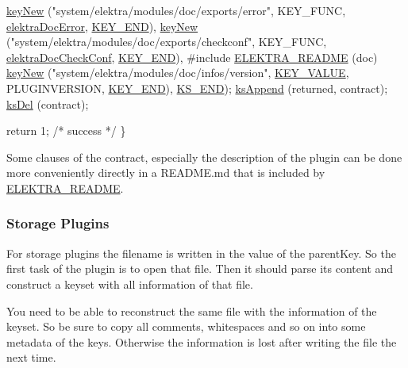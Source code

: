 \begin{DoxyCodeInclude}
                               \hyperlink{group__key_gad23c65b44bf48d773759e1f9a4d43b89}{keyNew} (\textcolor{stringliteral}{"system/elektra/modules/doc/exports/error"}, KEY\_FUNC, 
      \hyperlink{group__plugin_gad74b35f558ac7c3262f6069c5c47dc79}{elektraDocError}, \hyperlink{group__key_gga91fb3178848bd682000958089abbaf40aa8adb6fcb92dec58fb19410eacfdd403}{KEY\_END}),
                               \hyperlink{group__key_gad23c65b44bf48d773759e1f9a4d43b89}{keyNew} (\textcolor{stringliteral}{"system/elektra/modules/doc/exports/checkconf"}, KEY\_FUNC, 
      \hyperlink{group__plugin_ga1c8702efe0f3853c2d7ecca0889f78e8}{elektraDocCheckConf}, \hyperlink{group__key_gga91fb3178848bd682000958089abbaf40aa8adb6fcb92dec58fb19410eacfdd403}{KEY\_END}),
#include \hyperlink{group__plugin_ga78d616f68bf9fb0942f66478597467c6}{ELEKTRA\_README} (doc)
                               \hyperlink{group__key_gad23c65b44bf48d773759e1f9a4d43b89}{keyNew} (\textcolor{stringliteral}{"system/elektra/modules/doc/infos/version"}, 
      \hyperlink{group__key_gga91fb3178848bd682000958089abbaf40ac66e4a49d09212b79f5754ca6db5bd2e}{KEY\_VALUE}, PLUGINVERSION, \hyperlink{group__key_gga91fb3178848bd682000958089abbaf40aa8adb6fcb92dec58fb19410eacfdd403}{KEY\_END}), \hyperlink{kdbenum_8c_a7a28fce3773b2c873c94ac80b8b4cd54}{KS\_END});
                \hyperlink{group__keyset_ga21eb9c3a14a604ee3a8bdc779232e7b7}{ksAppend} (returned, contract);
                \hyperlink{group__keyset_ga27e5c16473b02a422238c8d970db7ac8}{ksDel} (contract);

                \textcolor{keywordflow}{return} 1; \textcolor{comment}{/* success */}
        \}
\end{DoxyCodeInclude}
 Some clauses of the contract, especially the description of the plugin can be done more conveniently directly in a R\+E\+A\+D\+M\+E.\+md that is included by \hyperlink{group__plugin_ga78d616f68bf9fb0942f66478597467c6}{E\+L\+E\+K\+T\+R\+A\+\_\+\+R\+E\+A\+D\+ME}.\hypertarget{group__plugin_storage}{}\subsubsection{Storage Plugins}\label{group__plugin_storage}
For storage plugins the filename is written in the value of the parent\+Key. So the first task of the plugin is to open that file. Then it should parse its content and construct a keyset with all information of that file.

You need to be able to reconstruct the same file with the information of the keyset. So be sure to copy all comments, whitespaces and so on into some metadata of the keys. Otherwise the information is lost after writing the file the next time.

